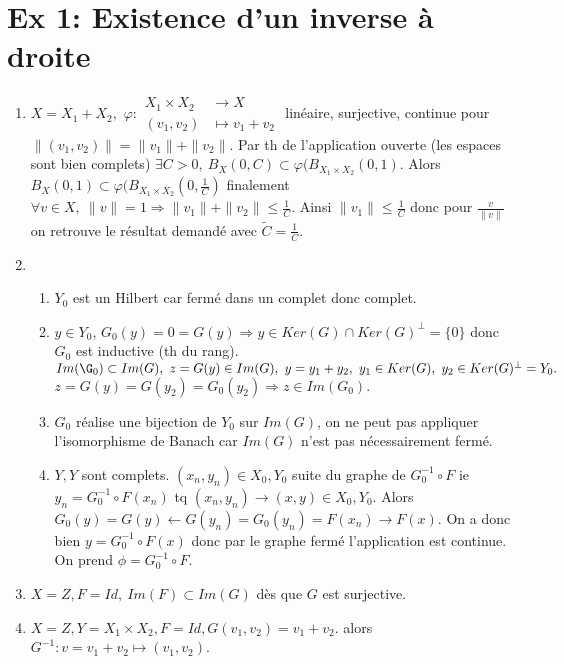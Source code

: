 \documentclass[a4paper]{article}
\begin{document}
\section*{Ex 1: Existence d'un inverse à droite}
\begin{enumerate}
    \item $X=X_1+X_2,$ $\varphi  :\begin{aligned}
        X_1\times X_2 &\longrightarrow  X\\
        (v_1,v_2)&\longmapsto v_1+v_2
    \end{aligned}$ linéaire, surjective, continue pour $\|(v_1,v_2)\|=\|v_1\|+\|v_2\|.$ Par th de l'application ouverte (les espaces sont bien complets) $\exists C>0,\ B_X(0,C)\subset \varphi (B_{X_1\times X_2}(0,1).$ Alors $B_X(0,1)\subset \varphi (B_{X_1\times X_2}(0,\frac{1}{C})$ finalement $\forall v\in X,\ \|v\|=1\Rightarrow \|v_1\|+\|v_2\|\le \frac{1}{C} $. Ainsi $\|v_1\|\le \frac{1}{C}$ donc pour $\frac{v}{\|v\|}$ on retrouve le résultat demandé avec $\tilde{C}=\frac{1}{C}.$
    \item
    \begin{enumerate}
        \item $Y_0$ est un Hilbert car fermé dans un complet donc complet.
        \item $y\in Y_0$, $G_0(y)=0=G(y)\Rightarrow y\in Ker(G)\cap Ker(G)^\bot=\{0\} $ donc $G_0$  est inductive (th du rang). $Im(\G_0)\subset Im(G),\ z=G(y)\in Im(G),\ y=y_1+y_2,\ y_1\in Ker(G),\ y_2\in Ker(G)^\bot=Y_0.$ $z=G(y)=G(y_2)=G_0(y_2)\Rightarrow z\in Im(G_0).$
        \item $G_0$ réalise une bijection de $Y_0$ sur $Im(G)$, on ne peut pas appliquer l'isomorphisme de Banach car $Im(G)$ n'est pas nécessairement fermé.
        \item $Y,Y$ sont complets. $(x_{n},y_n)\in X_0,Y_0$ suite du graphe de $G^{-1} _0\circ F$ ie $y_n=G_0^{-1} \circ F(x_n)$ tq $(x_{n},y_n)\to (x,y)\in X_0,Y_0.$ Alors $G_0(y)=G(y)\leftarrow G(y_n)=G_0(y_n)=F(x_{n})\rightarrow F(x)$. On a donc bien $y=G_0^{-1} \circ F(x)$ donc par le graphe fermé l'application est continue. On prend $\phi = G_0^{-1} \circ F$.
    \end{enumerate}
    \item $X=Z,F=Id,\ Im(F)\subset Im(G)$ dès que $G$ est surjective.
    \item $X=Z,Y=X_1\times X_2,F=Id,G(v_1,v_2)=v_1+v_2.$  alors $G^{-1} : v=v_1+v_2\mapsto (v_1,v_2)$.
\end{enumerate}
\end{document}
